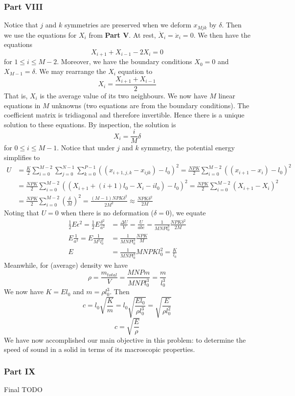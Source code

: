 \documentclass[letterpaper,12pt]{article}
\begin{document}
\begin{flushleft}
    \subsubsection*{Part VIII}
    Notice that $j$ and $k$ symmetries are preserved when we deform $x_{Mjk}$ by $\delta$. Then we use the equations for $X_i$ from \textbf{Part V}. At rest, $\ddot{X}_i = \ddot{x}_i = 0$. We then have the equations
    $$X_{i+1} + X_{i-1} - 2X_i = 0$$
    for $1 \leq i \leq M-2$. Moreover, we have the boundary conditions $X_0 = 0$ and $X_{M-1} = \delta$. We may rearrange the $X_i$ equation to
    $$X_i = \frac{X_{i+1} + X_{i-1}}{2}$$
    That is, $X_i$ is the average value of its two neighbours. We now have $M$ linear equations in $M$ unknowns (two equations are from the boundary conditions). The coefficient matrix is tridiagonal and therefore invertible. Hence there is a unique solution to these equations. By inspection, the solution is
    $$X_i = \frac{i}{M} \delta$$
    for $0 \leq i \leq M-1$. Notice that under $j$ and $k$ symmetry, the potential energy simplifies to
    \begin{align*}
        U &= \frac{K}{2}\sum_{i=0}^{M-2}\sum_{j=0}^{N-1}\sum_{k=0}^{P-1}\left((x_{i+1,j,k} - x_{ijk}) - l_0\right)^2 = \frac{NPK}{2}\sum_{i=0}^{M-2}\left((x_{i+1} - x_{i}) - l_0\right)^2 \\
        &= \frac{NPK}{2}\sum_{i=0}^{M-2}\left((X_{i+1} + (i+1)l_0 - X_{i} - il_0) - l_0\right)^2 = \frac{NPK}{2}\sum_{i=0}^{M-2}\left(X_{i+1} - X_{i}\right)^2 \\
        &= \frac{NPK}{2}\sum_{i=0}^{M-2}\left(\frac{\delta}{M}\right)^2 = \frac{(M-1)NPK\delta^2}{2M^2} \approx \frac{NPK\delta^2}{2M}
    \end{align*}
    Noting that $U = 0$ when there is no deformation ($\delta = 0$), we equate
    \begin{align*}
        \frac{1}{2}E\epsilon^2 = \frac{1}{2}E\frac{\delta^2}{a^2} &= \frac{\Delta U}{V} = \frac{U}{abc} = \frac{1}{MNPl_0^3} \frac{NPK\delta^2}{2M} \\
        E\frac{1}{a^2} = E\frac{1}{M^2l_0^2} &= \frac{1}{MNPl_0^3} \frac{NPK}{M} \\
        E &= \frac{1}{MNPl_0^3} MNPKl_0^2 = \frac{K}{l_0}
    \end{align*}
    Meanwhile, for (average) density we have
    $$\rho = \frac{m_{total}}{V} = \frac{MNPm}{MNPl_0^3} = \frac{m}{l_0^3}$$
    We now have $K = El_0$ and $m = \rho l_0^3$. Then
    $$c = l_0\sqrt{\frac{K}{m}} = l_0\sqrt{\frac{El_0}{\rho l_0^3}} = \sqrt{\frac{E}{\rho l_0^2}}$$
    $$\boxed{c = \sqrt{\frac{E}{\rho}}}$$
    We have now accomplished our main objective in this problem: to determine the speed of sound in a solid in terms of its macroscopic properties.

    \subsubsection*{Part IX}
    Final TODO

\end{flushleft}
\end{document}
